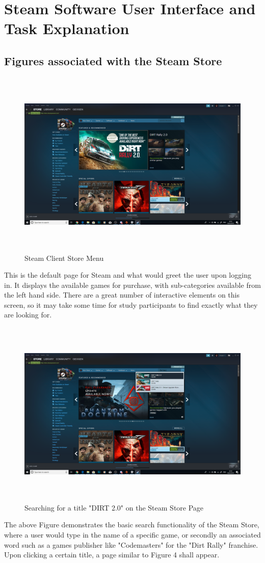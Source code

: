 \chapter{Steam Software User Interface and Task Explanation}
\section{Figures associated with the Steam Store}
\begin{figure}[H]
\includegraphics[width=16cm,height=9cm]{Screenshots/SteamScreenShots/SteamMainShopMenu.png}
\caption{Steam Client Store Menu}	
\end{figure}
This is the default page for Steam and what would greet the user upon logging in. It displays the available games for purchase, with sub-categories available from the left hand side. There are a great number of interactive elements on this screen, so it may take some time for study participants to find exactly what they are looking for.

\begin{figure}[H]
\includegraphics[width=16cm,height=9cm]{Screenshots/SteamScreenShots/SearchingForAGame.png}
\caption{Searching for a title "DIRT 2.0" on the Steam Store Page}
\end{figure}
The above Figure demonstrates the basic search functionality of the Steam Store, where a user would type in the name of a specific game, or secondly an associated word such as a games publisher like "Codemasters" for the "Dirt Rally" franchise. Upon clicking a certain title, a page similar to Figure 4 shall appear.

